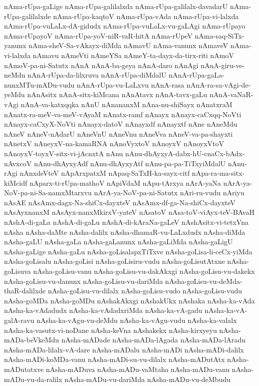 {nAma-rUpa-gaLige
nAma-rUpa-galilalxda
nAma-rUpa-galilalx-davadarU
nAma-rUpa-galilalxde
nAma-rUpa-kaqtoV
nAma-rUpa-vAda
nAma-rUpa-vi-lalxda
nAma-rUpa-vuLaLx-dA-gidudx
nAma-rUpa-vuLaLx-vu-gaLAgi
nAma-rUpayo
nAma-rUpayoV
nAma-rUpa-yoV-niR-vaR-hitA
nAma-rUpeV
nAma-saq-SiTx-yanunx
nAma-sheV-Sa-vAkayx-diMda
nAmavU
nAma-vanunx
nAmaveV
nAma-vi-lalxda
nAmavu
nAmeVti
nAmeYSa
nAmeY-ta-dayx-da-tirx-riti
nAmoV
nAmoV-pa-ni-Satutx
nAnA
nAnA-ba-geya
nAnA-daro
nAnAgi
nAnA-giru-ve-neMdu
nAnA-rUpa-da-lilxruva
nAnA-rUpa-diMdalU
nAnA-rUpa-gaLa-nunxMTu-mADu-vudu
nAnA-rUpa-vu-LaLxvu
nAnA-rasa
nAnA-ra-sa-vAgi-de-yeMdu
nAnAsitx
nAnA-sitx-kiMcana
nAnAtavx
nAnA-tavx-gaLu
nAnA-vaNaR-vAgi
nAnA-va-katxqqka
nAnU
nAnananxM
nAna-nu-shiSayx
nAnatxraM
nAnatx-ra-meV-va-meV-vAyaM
nAnatx-ramf
nAnayx
nAnayx-caCxqq-NoVti
nAnayx-caCxyX-NoVti
nAnayx-datoV
nAnayxdf
nAnayxtf
nAne
nAneMdu
nAneV
nAneV-nAdarU
nAneVnU
nAneVnu
nAneVva
nAneV-va-pa-shayxti
nAnetxV
nAneyxV-na-kamaRNA
nAnoVyxtoV
nAnoyxV
nAnoyxVtoV
nAnoyxV-toyxV-sitx-vi-jAcnxtA
nAnu
nAnu-dhAyxyA-dabx-hU-cnaCx-bAdx-nAvxcoV
nAnu-dhAyxyAdf
nAnu-dhAyxyAtf
nAnu-pa-pa-TiTxyiMdalU
nAnu-rAgi
nAnxdeVteV
nApArxpatxM
nApaq-SaTxH-ka-sayx-citf
nApa-ra-ma-sitx-kiMcidf
nAparx-ti-rUpa-mathoV
nApiVdaM
nApu-tArxya
nArA-yaNa
nArA-ya-NoV-pa-ni-Sa-namxMtarxvu
nArA-ya-NoV-pa-ni-Satutx
nAri-ru-vudu
nAriyu
nAsAE
nAsAmx-dagx-Na-shiCx-dayxteV
nAsAmx-df-ga-Na-shiCx-dayxteV
nAsAyxnanxM
nAsAyx-nanxMkirxV-yateV
nAsatoV
nAsa-toV-viAyx-teV-BAvaH
nAshA-di-gaLa
nAshA-di-gaLu
nAshA-di-kAraNa-gaLeV
nAshAsitx-vi-tetxVna
nAsha
nAsha-daMte
nAsha-dalilx
nAsha-dhamaR-vu-LaLxdudx
nAsha-diMda
nAsha-gaLU
nAsha-gaLa
nAsha-gaLanunx
nAsha-gaLiMda
nAsha-gaLigU
nAsha-gaLige
nAsha-gaLu
nAsha-goLisalapxTiTxve
nAsha-goLisa-li-ceCx-yiMda
nAsha-goLisalu
nAsha-goLisi
nAsha-goLisiru-vudu
nAsha-goLisutAtxne
nAsha-goLisuva
nAsha-goLisu-vanu
nAsha-goLisu-vu-dakAkxgi
nAsha-goLisu-vu-dakekx
nAsha-goLisu-vu-danunx
nAsha-goLisu-vu-dariMda
nAsha-goLisu-vu-deMda-thaR-dalilxde
nAsha-goLisu-vu-dilalx
nAsha-goLisu-vudo
nAsha-goLisu-vudu
nAsha-goMDa
nAsha-goMDu
nAshakAkxgi
nAshakUkx
nAshaka
nAsha-ka-vAda
nAsha-ka-vAdadudx
nAsha-ka-vAdadxriMda
nAsha-ka-vA-gadu
nAsha-ka-vA-galA-ravu
nAsha-ka-vAgu-vu-deMdu
nAsha-ka-vAgu-vudu
nAsha-ka-valalx
nAsha-ka-vasutx-vi-noDane
nAsha-keVna
nAshakekx
nAsha-kirxyeyu
nAsha-mADa-beVkeMdu
nAsha-mADade
nAsha-mADa-lAgada
nAsha-mADa-lAradu
nAsha-mADa-lilalx-vA-dare
nAsha-mADalu
nAsha-mADi
nAsha-mADi-dalilx
nAsha-mADi-koMDa-vanu
nAsha-mADi-su-vu-dilalx
nAsha-mADutAtx
nAsha-mADutatxve
nAsha-mADuva
nAsha-mADu-vaMtaha
nAsha-mADu-vanu
nAsha-mADu-vu-da-ralilx
nAsha-mADu-vu-dariMda
nAsha-mADu-vu-deMbudu
}
